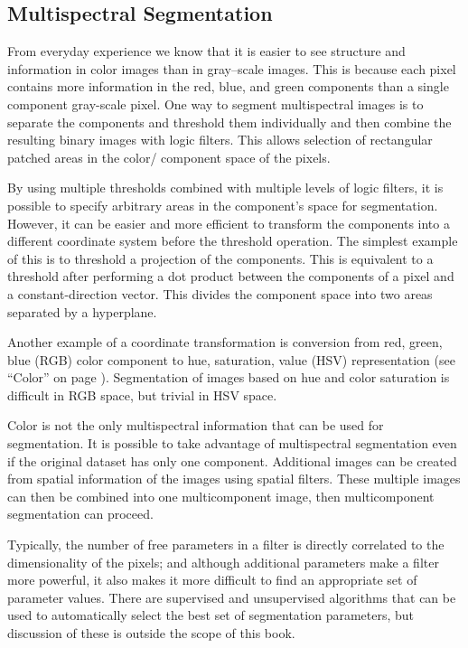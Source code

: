 \subsection{Multispectral Segmentation}

From everyday experience we know that it is easier to see structure and information in color images than in gray--scale images. This is because each pixel contains more information in the red, blue, and green components than a single component gray-scale pixel. One way to segment multispectral images is to separate the components and threshold them individually and then combine the resulting binary images with logic filters. This allows selection of rectangular patched areas in the color/ component space of the pixels.

By using multiple thresholds combined with multiple levels of logic filters, it is possible to specify arbitrary areas in the component's space for segmentation. However, it can be easier and more efficient to transform the components into a different coordinate system before the threshold operation. The simplest example of this is to threshold a projection of the components. This is equivalent to a threshold after performing a dot product between the components of a pixel and a constant-direction vector. This divides the component space into two areas separated by a hyperplane.

Another example of a coordinate transformation is conversion from red, green, blue (RGB) color component to hue, saturation, value (HSV) representation (see ``Color'' on page \pageref{sec:color}). Segmentation of images based on hue and color saturation is difficult in RGB space, but trivial in HSV space.

Color is not the only multispectral information that can be used for segmentation. It is possible to take advantage of multispectral segmentation even if the original dataset has only one component. Additional images can be created from spatial information of the images using spatial filters. These multiple images can then be combined into one multicomponent image, then multicomponent segmentation can proceed.

Typically, the number of free parameters in a filter is directly correlated to the dimensionality of the pixels; and although additional parameters make a filter more powerful, it also makes it more difficult to find an appropriate set of parameter values. There are supervised and unsupervised algorithms that can be used to automatically select the best set of segmentation parameters, but discussion of these is outside the scope of this book.


